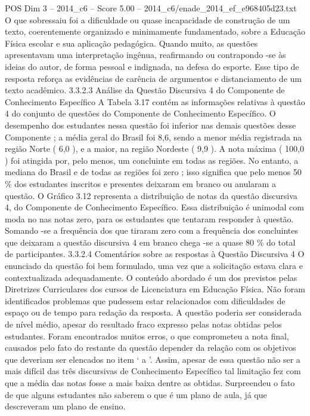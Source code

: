\begin{textsample}{POS Dim 3 – 2014\_c6 – Score 5.00 – 2014\_c6/enade\_2014\_ef\_e968405d23.txt}
O que sobressaiu foi a dificuldade ou quase incapacidade de construção de um texto, coerentemente organizado e minimamente fundamentado, sobre a Educação Física escolar e sua aplicação pedagógica.
Quando muito, as questões apresentavam uma interpretação ingênua, reafirmando ou contrapondo -se às ideias do autor, de forma pessoal e indignada, na defesa do esporte.
Esse tipo de resposta reforça as evidências de carência de argumentos e distanciamento de um texto acadêmico. 3.3.2.3 Análise da Questão Discursiva 4 do Componente de Conhecimento Específico A Tabela 3.17 contém as informações relativas à questão 4 do conjunto de questões do Componente de Conhecimento Específico.
O desempenho dos estudantes nessa questão foi inferior nas demais questões desse Componente ; a média geral do Brasil foi 8,6, sendo a menor média registrada na região Norte ( 6,0 ), e a maior, na região Nordeste ( 9,9 ).
A nota máxima ( 100,0 ) foi atingida por, pelo menos, um concluinte em todas as regiões.
No entanto, a mediana do Brasil e de todas as regiões foi zero ; isso significa que pelo menos 50 \% dos estudantes inscritos e presentes deixaram em branco ou anularam a questão.
O Gráfico 3.12 representa a distribuição de notas da questão discursiva 4, do Componente de Conhecimento Específico.
Essa distribuição é unimodal com moda no nas notas zero, para os estudantes que tentaram responder à questão.
Somando -se a frequência dos que tiraram zero com a frequência dos concluintes que deixaram a questão discursiva 4 em branco chega -se a quase 80 \% do total de participantes. 3.3.2.4 Comentários sobre as respostas à Questão Discursiva 4 O enunciado da questão foi bem formulado, uma vez que a solicitação estava clara e contextualizada adequadamente.
O conteúdo abordado é um dos previstos pelas Diretrizes Curriculares dos cursos de Licenciatura em Educação Física.
Não foram identificados problemas que pudessem estar relacionados com dificuldades de espaço ou de tempo para redação da resposta.
A questão poderia ser considerada de nível médio, apesar do resultado fraco expresso pelas notas obtidas pelos estudantes.
Foram encontrados muitos erros, o que comprometeu a nota final, causados pelo fato do restante da questão depender da relação com os objetivos que deveriam ser elencados no item ‘ a ’.
Assim, apesar de essa questão não ser a mais difícil das três discursivas de Conhecimento Específico tal limitação fez com que a média das notas fosse a mais baixa dentre as obtidas.
Surpreendeu o fato de que alguns estudantes não saberem o que é um plano de aula, já que descreveram um plano de ensino.

\end{textsample}
